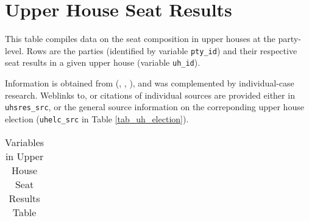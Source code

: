 \section{Upper House Seat Results}\label{sec_upper_house_seat_results}
This table compiles data on the seat composition in upper houses at the party-level. 
Rows are the parties (identified by variable \texttt{\footnotesize pty\_id}) and their respective seat results in a given upper house (variable \texttt{\footnotesize uh\_id}).

Information is obtained from \citeauthor{Nohlen2001} (\citeyear{Nohlen2001}, \citeyear{Nohlen2005}, \citeyear{Nohlen2010}), and was complemented by individual-case research. 
Weblinks to, or citations of individual sources are provided either in \texttt{\footnotesize uhsres\_src}, or the general source information on the correponding upper house election (\texttt{\footnotesize uhelc\_src} in Table \ref{tab_uh_election}).


\begin{center}
\begin{longtable}{L{4cm} L{6cm} L{3cm}}
\caption{Variables in Upper House Seat Results Table\label{tab_upper_house_seat_results}}


\end{longtable}
\end{center}
